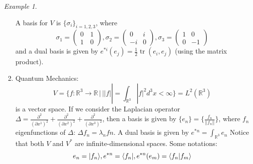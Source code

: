 \documentclass[a4paper,11pt,titlepage]{article}
\numberwithin{equation}{section}
\theoremstyle{definition}
\theoremstyle{remark}
\newtheorem{example}[theorem]{Example}
\DeclareMathOperator{\tr}{tr}
\newcommand{\rfield}{\mathbb{R}}
\begin{document}
\begin{example}
\begin{enumerate}
  A basis for $V$ is $\{\sigma_i\}_{i=1,2,3}$, where
  $$\sigma_1 = \left ( \begin{matrix}
  0\, &1 \\
  1\, &0
\end{matrix}
  \right), \sigma_2 = \left ( \begin{matrix}
  0 &i \\
  -i &0
\end{matrix}
  \right), \sigma_3 = \left ( \begin{matrix}
  1 &0 \\
  0 &-1
\end{matrix}
  \right)$$
  and a dual basis is given by $e^{*i}(e_j) = \frac{1}{2} \tr(e_i, e_j)$ (using the matrix product).
  \item Quantum Mechanics: $$V = \{ f \colon \rfield^3 \rightarrow \rfield \, | \, ||f|| = \int_{\rfield^3} |f|^2 d^3x < \infty \} = L^2(\rfield^3)$$ is a vector space. If we consider the Laplacian operator $\Delta = \frac{\partial^2}{(\partial x^1)^2} + \frac{\partial^2}{(\partial x^2)^2} + \frac{\partial^2}{(\partial x^3)^2}$, then a basis is given by $\{e_n\} = \{\frac{f_n}{||f_n||}\}$, where $f_n$ eigenfunctions of $\Delta$: $\Delta f_n = \lambda_n fn$.
  A dual basis is given by $e^{*n} = \int_{\rfield^3} e_n$
  Notice that both $V$ and $V^*$ are infinite-dimensional spaces.
  Some notations:
  $$e_n = |f_n \rangle, e^{*n} = \langle f_n |, e^{*n}(e_m) = \braket{f_n | f_m}$$
  \end{enumerate}
\end{example}
\end{document}
